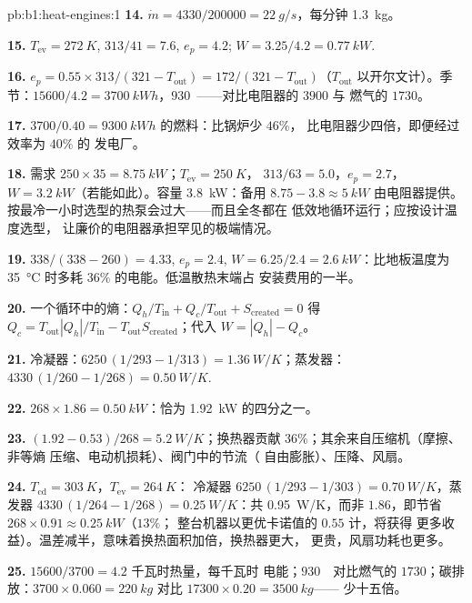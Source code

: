 \begin{solution}{pb:b1:heat-engines:1}
\textbf{14.} $\dot m = 4330/200000 = \qty{22}{g/s}$，每分钟 \qty{1.3}{kg}。

\textbf{15.} $T_{\mathrm{ev}} = \qty{272}{K}$, $313/41 = 7.6$, $e_p = 4.2$;
$W = 3.25/4.2 = \qty{0.77}{kW}$.

\textbf{16.} $e_p = 0.55 \times 313/(321 - T_{\mathrm{out}}) = 172/(321 -
T_{\mathrm{out}})$（$T_{\mathrm{out}}$ 以开尔文计）。季节：$15600/4.2 =
\qty{3700}{kW h}$，$930$~\texteuro——对比电阻器的 $3900$ 与
燃气的 $1730$。

\textbf{17.} $3700/0.40 = \qty{9300}{kW h}$ 的燃料：比锅炉少 $46\%$，
比电阻器少四倍，即便经过效率为 $40\%$ 的
发电厂。

\textbf{18.} 需求 $250 \times 35 = \qty{8.75}{kW}$；$T_{\mathrm{ev}} = \qty{250}{K}$，
$313/63 = 5.0$，$e_p = 2.7$，$W = \qty{3.2}{kW}$（若能如此）。容量
\qty{3.8}{kW}：备用 $8.75 - 3.8 \approx \qty{5}{kW}$ 由电阻器提供。
按最冷一小时选型的热泵会过大——而且全冬都在
低效地循环运行；应按设计温度选型，
让廉价的电阻器承担罕见的极端情况。

\textbf{19.} $338/(338 - 260) = 4.33$, $e_p = 2.4$, $W = 6.25/2.4 =
\qty{2.6}{kW}$：比地板温度为
\qty{35}{\degreeCelsius} 时多耗 $36\%$ 的电能。低温散热末端占
安装费用的一半。

\textbf{20.} 一个循环中的熵：$Q_h/T_{\mathrm{in}} + Q_c/T_{\mathrm{out}} +
S_{\mathrm{created}} = 0$ 得 $Q_c = T_{\mathrm{out}}|Q_h|/T_{\mathrm{in}} -
T_{\mathrm{out}}S_{\mathrm{created}}$；代入 $W = |Q_h| - Q_c$。

\textbf{21.} 冷凝器：$6250\,(1/293 - 1/313) = \qty{1.36}{W/K}$；蒸发器：
$4330\,(1/260 - 1/268) = \qty{0.50}{W/K}$.

\textbf{22.} $268 \times 1.86 = \qty{0.50}{kW}$：恰为
\qty{1.92}{kW} 的四分之一。

\textbf{23.} $(1.92 - 0.53)/268 = \qty{5.2}{W/K}$；换热器贡献
$36\%$；其余来自压缩机（摩擦、非等熵
压缩、电动机损耗）、阀门中的节流（
自由膨胀）、压降、风扇。

\textbf{24.} $T_{\mathrm{cd}} = \qty{303}{K}$，$T_{\mathrm{ev}} = \qty{264}{K}$：
冷凝器 $6250\,(1/293 - 1/303) = \qty{0.70}{W/K}$，蒸发器
$4330\,(1/264 - 1/268) = \qty{0.25}{W/K}$：共 \qty{0.95}{W/K}，而非
$1.86$，即节省 $268 \times 0.91 \approx \qty{0.25}{kW}$（$13\%$；
整台机器以更优卡诺值的 $0.55$ 计，将获得
更多收益）。温差减半，意味着换热面积加倍，换热器更大，
更贵，风扇功耗也更多。

\textbf{25.} $15600/3700 = 4.2$ 千瓦时热量，每千瓦时
电能；$930$~\texteuro\ 对比燃气的 $1730$；碳排放：$3700
\times 0.060 = \qty{220}{kg}$ 对比 $17300 \times 0.20 = \qty{3500}{kg}$——
少十五倍。
\end{solution}
